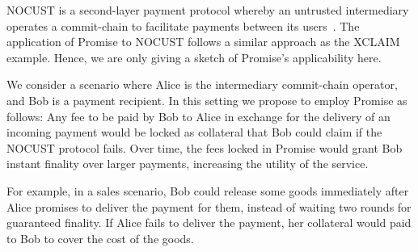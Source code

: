 \documentclass[runningheads]{llncs}
\newcommand{\sys}{Promise\xspace}
\begin{document}
NOCUST is a second-layer payment protocol whereby an untrusted intermediary operates a commit-chain to facilitate payments between its users~\cite{Khalil2019NOCUST}.
The application of \sys to NOCUST follows a similar approach as the XCLAIM example.
Hence, we are only giving a sketch of \sys's applicability here.

We consider a scenario where Alice is the intermediary commit-chain operator, and Bob is a payment recipient. In this setting we propose to employ \sys as follows: Any fee to be paid by Bob to Alice in exchange for the delivery of an incoming payment would be locked as collateral that Bob could claim if the NOCUST protocol fails. Over time, the fees locked in \sys would grant Bob instant finality over larger payments, increasing the utility of the service.


For example, in a sales scenario, Bob could release some goods immediately after Alice promises to deliver the payment for them, instead of waiting two rounds for guaranteed finality. If Alice fails to deliver the payment, her collateral would paid to Bob to cover the cost of the goods.

\end{document}
